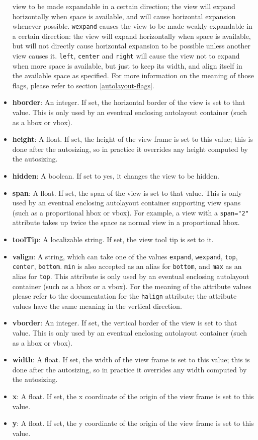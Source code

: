 \begin{itemize}
  view to be made expandable in a certain direction; the view will
  expand horizontally when space is available, and will cause
  horizontal expansion whenever possible.  \texttt{wexpand} causes the
  view to be made weakly expandable in a certain direction: the view
  will expand horizontally when space is available, but will not
  directly cause horizontal expansion to be possible unless another
  view causes it.  \texttt{left}, \texttt{center} and \texttt{right}
  will cause the view not to expand when more space is available, but
  just to keep its width, and align itself in the available space as
  specified.  For more information on the meaning of those flags,
  please refer to section \ref{autolayout-flags}.
\item {\bf hborder}: An integer.  If set, the horizontal border of the
  view is set to that value.  This is only used by an eventual
  enclosing autolayout container (such as a hbox or vbox).
\item {\bf height}: A float.  If set, the height of the view frame is
  set to this value; this is done after the autosizing, so in practice
  it overrides any height computed by the autosizing.
\item {\bf hidden}: A boolean.  If set to yes, it changes the view to
  be hidden.
\item {\bf span}: A float.  If set, the span of the view is set to
  that value.  This is only used by an eventual enclosing autolayout
  container supporting view spans (such as a proportional hbox or
  vbox).  For example, a view with a \texttt{span="2"} attribute takes
  up twice the space as normal view in a proportional hbox.
\item {\bf toolTip}: A localizable string.  If set, the view tool tip
  is set to it.
\item {\bf valign}: A string, which can take one of the values
  \texttt{expand}, \texttt{wexpand}, \texttt{top}, \texttt{center},
  \texttt{bottom}.  \texttt{min} is also accepted as an alias for
  \texttt{bottom}, and \texttt{max} as an alias for \texttt{top}.
  This attribute is only used by an eventual enclosing autolayout
  container (such as a hbox or a vbox).  For the meaning of the
  attribute values please refer to the documentation for the
  \texttt{halign} attribute; the attribute values have the same
  meaning in the vertical direction.
\item {\bf vborder}: An integer.  If set, the vertical border of the
  view is set to that value.  This is only used by an eventual
  enclosing autolayout container (such as a hbox or vbox).
\item {\bf width}: A float.  If set, the width of the view frame is
  set to this value; this is done after the autosizing, so in practice
  it overrides any width computed by the autosizing.
\item {\bf x}: A float.  If set, the x coordinate of the origin of the
  view frame is set to this value.
\item {\bf y}: A float.  If set, the y coordinate of the origin of the
  view frame is set to this value.
\end{itemize}

